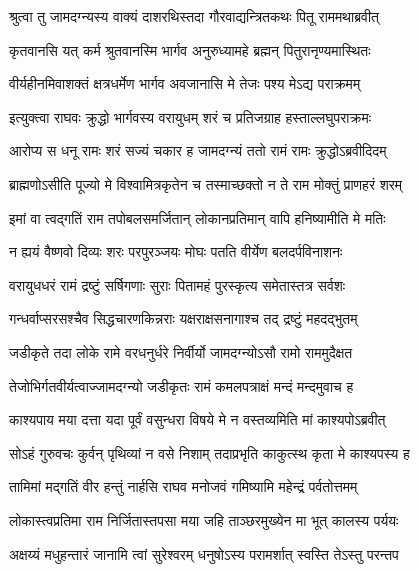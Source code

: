 
\twolineshloka
{श्रुत्वा तु जामदग्न्यस्य वाक्यं दाशरथिस्तदा}
{गौरवाद्यन्त्रितकथः पितू राममथाब्रवीत्} %

\twolineshloka
{कृतवानसि यत् कर्म श्रुतवानस्मि भार्गव}
{अनुरुध्यामहे ब्रह्मन् पितुरानृण्यमास्थितः} %

\twolineshloka
{वीर्यहीनमिवाशक्तं क्षत्रधर्मेण भार्गव}
{अवजानासि मे तेजः पश्य मेऽद्य पराक्रमम्} %

\twolineshloka
{इत्युक्त्वा राघवः क्रुद्धो भार्गवस्य वरायुधम्}
{शरं च प्रतिजग्राह हस्ताल्लघुपराक्रमः} %

\twolineshloka
{आरोप्य स धनू रामः शरं सज्यं चकार ह}
{जामदग्न्यं ततो रामं रामः क्रुद्धोऽब्रवीदिदम्} %

\twolineshloka
{ब्राह्मणोऽसीति पूज्यो मे विश्वामित्रकृतेन च}
{तस्माच्छक्तो न ते राम मोक्तुं प्राणहरं शरम्} %

\twolineshloka
{इमां वा त्वद्गतिं राम तपोबलसमर्जितान्}
{लोकानप्रतिमान् वापि हनिष्यामीति मे मतिः} %

\twolineshloka
{न ह्ययं वैष्णवो दिव्यः शरः परपुरञ्जयः}
{मोघः पतति वीर्येण बलदर्पविनाशनः} %

\twolineshloka
{वरायुधधरं रामं द्रष्टुं सर्षिगणाः सुराः}
{पितामहं पुरस्कृत्य समेतास्तत्र सर्वशः} %

\twolineshloka
{गन्धर्वाप्सरसश्चैव सिद्धचारणकिन्नराः}
{यक्षराक्षसनागाश्च तद् द्रष्टुं महदद्भुतम्} %

\twolineshloka
{जडीकृते तदा लोके रामे वरधनुर्धरे}
{निर्वीर्यो जामदग्न्योऽसौ रामो राममुदैक्षत} %

\twolineshloka
{तेजोभिर्गतवीर्यत्वाज्जामदग्न्यो जडीकृतः}
{रामं कमलपत्राक्षं मन्दं मन्दमुवाच ह} %

\twolineshloka
{काश्यपाय मया दत्ता यदा पूर्वं वसुन्धरा}
{विषये मे न वस्तव्यमिति मां काश्यपोऽब्रवीत्} %

\twolineshloka
{सोऽहं गुरुवचः कुर्वन् पृथिव्यां न वसे निशाम्}
{तदाप्रभृति काकुत्स्थ कृता मे काश्यपस्य ह} %

\twolineshloka
{तामिमां मद्गतिं वीर हन्तुं नार्हसि राघव}
{मनोजवं गमिष्यामि महेन्द्रं पर्वतोत्तमम्} %

\twolineshloka
{लोकास्त्वप्रतिमा राम निर्जितास्तपसा मया}
{जहि ताञ्छरमुख्येन मा भूत् कालस्य पर्ययः} %

\twolineshloka
{अक्षय्यं मधुहन्तारं जानामि त्वां सुरेश्वरम्}
{धनुषोऽस्य परामर्शात् स्वस्ति तेऽस्तु परन्तप} %

